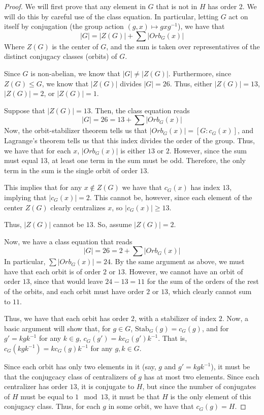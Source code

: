 \documentclass[12pt,reqno]{amsart}
\newcommand{\inv}{^{-1}}
\begin{document}
\begin{proof}
    We will first prove that any element in $G$ that is not in $H$ has
    order 2. We will do this by careful use of the class equation. In
    particular, letting $G$ act on itself by conjugation (the group action
    $(g,x)\mapsto gxg\inv$), we have that
    \[
        |G| = |Z(G)| + \sum|Orb_G(x)|
    \]
    Where $Z(G)$ is the center of $G$, and the sum is taken over
    representatives of the distinct conjugacy classes (orbits) of $G$.
    
    Since $G$ is non-abelian, we know that $|G|\neq|Z(G)|$. Furthermore, since
    $Z(G)\leq G$, we know that $|Z(G)|$ divides $|G|=26$. Thus, either
    $|Z(G)| = 13$, $|Z(G)| = 2$, or $|Z(G)| = 1$.

    Suppose that $|Z(G)| = 13$.
    Then, the class equation reads
    \[
        |G| = 26 = 13 + \sum|Orb_G(x)|
    \]
    Now, the orbit-stabilizer theorem tells us that $|Orb_G(x)| = [G:c_G(x)]$,
    and Lagrange's theorem tells us that this index divides the order of the
    group. Thus, we have that for each $x$, $|Orb_G(x)|$ is either $13$ or $2$.
    However, since the sum must equal 13, at least one term in the sum must be
    odd. Therefore, the only term in the sum is the single orbit of order $13$.

    This implies that for any $x\not\in Z(G)$ we have that $c_G(x)$ has index
    $13$, implying that $|c_G(x)| = 2$. This cannot be, however, since each
    element of the center $Z(G)$ clearly centralizes $x$, so $|c_G(x)|\geq 13$.

    Thus, $|Z(G)|$ cannot be $13$. So, assume $|Z(G)| = 2$.

    Now, we have a class equation that reads
    \[
    |G| = 26 = 2 + \sum|Orb_G(x)|
    \]
    In particular, $\sum|Orb_G(x)| = 24$. By the same argument as above, we
    must have that each orbit is of order $2$ or $13$. However, we cannot
    have an orbit of order $13$, since that would leave $24-13=11$ for the sum
    of the orders of the rest of the orbits, and each orbit must have order $2$
    or $13$, which clearly cannot sum to $11$.

    Thus, we have that each orbit has order $2$, with a stabilizer of index
    $2$. Now, a basic argument will show that, for $g\in G$, $\textrm{Stab}_G(g)
    = c_G(g)$, and for $g' = kgk\inv$ for any $k\in g$, $c_G(g') =
    kc_G(g')k\inv$.
    That is, $c_G(kgk\inv) = kc_G(g)k\inv$ for any $g,k\in G$.

    Since each orbit has only two elements in it (say, $g$ and $g'=kgk\inv$),
    it must be that the conjugcacy class of centralizers of $g$ has at most
    two elements. Since each centralizer has order $13$, it is conjugate to
    $H$, but since the number of conjugates of $H$ must be equal to $1\mod 13$,
    it must be that $H$ is the only element of this conjugacy class. Thus,
    for each $g$ in some orbit, we have that $c_G(g) = H$.


\end{proof}
\end{document}
